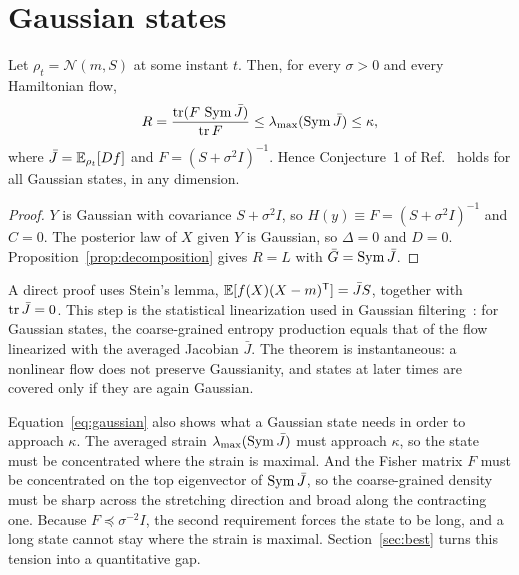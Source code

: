 \section{Gaussian states}
\label{sec:gaussian}

\begin{theorem}
\label{thm:gaussian}
Let $\rho_t = \mathcal N(m,S)$ at some instant $t$. Then, for every $\sigma > 0$ and every Hamiltonian flow,
\begin{equation}
R = \frac{\operatorname{tr}(F\,\operatorname{Sym}\bar J)}{\operatorname{tr} F} \leq \lambda_{\max}(\operatorname{Sym}\bar J) \leq \kappa,
\label{eq:gaussian}
\end{equation}
where $\bar J = \mathbb{E}_{\rho_t}[Df]$ and $F = (S + \sigma^2 I)^{-1}$. Hence Conjecture~1 of Ref.~\cite{namba2026arrow} holds for all Gaussian states, in any dimension.
\end{theorem}

\begin{proof}
$Y$ is Gaussian with covariance $S + \sigma^2 I$, so $H(y) \equiv F = (S+\sigma^2I)^{-1}$ and $C = 0$. The posterior law of $X$ given $Y$ is Gaussian, so $\Delta = 0$ and $D = 0$. Proposition~\ref{prop:decomposition} gives $R = L$ with $\bar G = \operatorname{Sym}\bar J$.
\end{proof}

A direct proof uses Stein's lemma, $\mathbb{E}[f(X)(X-m)^{\mathsf T}] = \bar J S$, together with $\operatorname{tr}\bar J = 0$. This step is the statistical linearization used in Gaussian filtering~\cite{sarkka2013}: for Gaussian states, the coarse-grained entropy production equals that of the flow linearized with the averaged Jacobian $\bar J$. The theorem is instantaneous: a nonlinear flow does not preserve Gaussianity, and states at later times are covered only if they are again Gaussian.

Equation~\eqref{eq:gaussian} also shows what a Gaussian state needs in order to approach $\kappa$. The averaged strain $\lambda_{\max}(\operatorname{Sym}\bar J)$ must approach $\kappa$, so the state must be concentrated where the strain is maximal. And the Fisher matrix $F$ must be concentrated on the top eigenvector of $\operatorname{Sym}\bar J$, so the coarse-grained density must be sharp across the stretching direction and broad along the contracting one. Because $F \preceq \sigma^{-2}I$, the second requirement forces the state to be long, and a long state cannot stay where the strain is maximal. Section~\ref{sec:best} turns this tension into a quantitative gap.
